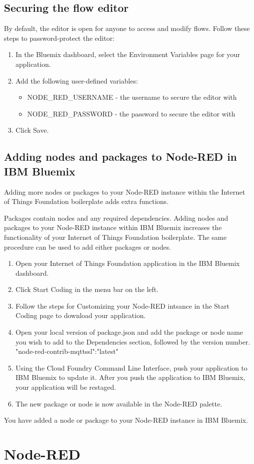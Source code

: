 \documentclass[]{book}
\begin{document}
\subsection{Securing the flow editor}
By default, the editor is open for anyone to access and modify flows. Follow these steps to password-protect the editor:

\begin{enumerate}
\item In the Bluemix dashboard, select the Environment Variables page for your application.
\item Add the following user-defined variables:
\begin{itemize}
\item NODE\_RED\_USERNAME - the username to secure the editor with
\item NODE\_RED\_PASSWORD - the password to secure the editor with
\end{itemize}
\item Click Save.
\end{enumerate}
\subsection{Adding nodes and packages to Node-RED in IBM Bluemix}
Adding more nodes or packages to your Node-RED instance within the Internet of Things Foundation boilerplate adds extra functions.

Packages contain nodes and any required dependencies. Adding nodes and packages to your Node-RED instance within IBM Bluemix increases the functionality of your Internet of Things Foundation boilerplate. The same procedure can be used to add either packages or nodes.
\begin{enumerate}
\item Open your Internet of Things Foundation application in the IBM Bluemix dashboard.
\item Click Start Coding in the menu bar on the left.
\item Follow the steps for Customizing your Node-RED intsance in the Start Coding page to download your application.
\item Open your local version of package.json and add the package or node name you wish to add to the Dependencies section, followed by the version number. "node-red-contrib-mqttssl":"latest"
\item Using the Cloud Foundry Command Line Interface, push your application to IBM Bluemix to update it. After you push the application to IBM Bluemix, your application will be restaged.
\item The new package or node is now available in the Node-RED palette.
\end{enumerate}
You have added a node or package to your Node-RED instance in IBM Bluemix.


\section{Node-RED}
\label{nodered}


\end{document}
